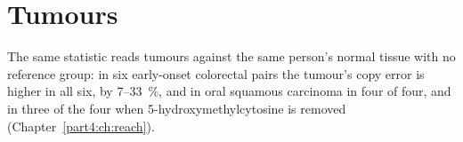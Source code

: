 \section{Tumours}

The same statistic reads tumours against the same person's normal tissue with no reference group: in six early-onset
colorectal pairs the tumour's copy error is higher in all six, by 7--33~\%, and in oral squamous carcinoma in four of four, and in
three of the four when 5-hydroxymethylcytosine is removed (Chapter~\ref{part4:ch:reach}). \measured
